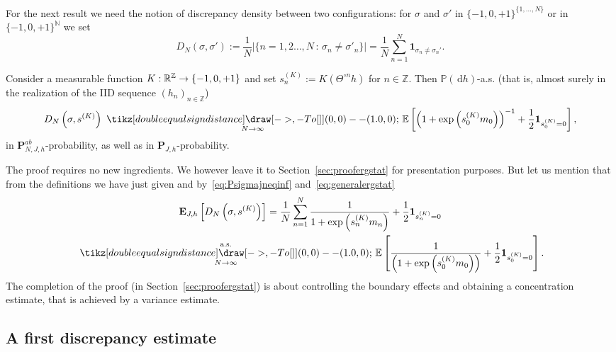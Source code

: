 \documentclass[10pt]{amsart}
\theoremstyle{definition}\newtheorem{defi}[theo]{Definition}\newtheorem{rema}[theo]{Remark}\newtheorem{exam}[theo]{Example}\newtheorem{exem}[theo]{Example}\newtheorem{nota}[theo]{Notation}
\newlength{\LETTERheight}
\newcommand*{\longto}[1]{\ %
{\tikz[double equal sign distance] \draw [->,-{To[]}] (0,0) -- (#1,0);}\ }
\newcommand{\ind}{\mathbf{1}}
\newcommand{\bP}{\mathbf{P}}
\newcommand{\bE}{\mathbf{E}}
\newcommand{\bbE}{\mathbb{E}}
\newcommand{\bbN}{\mathbb{N}}
\newcommand{\bbP}{\mathbb{P}}
\newcommand{\bbR}{\mathbb{R}}
\newcommand{\bbZ}{\mathbb{Z}}
\newcommand{\dd}{\,\mathrm{d}}
\newcommand{\gs}{\sigma}
\renewcommand*{\to}{\mathchoice{\longrightarrow}{\rightarrow}{\rightarrow}{\rightarrow}}
\begin{document}
For the next result we need the notion of discrepancy density between two configurations: for $\sigma$ and $\sigma'$ in $ \{-1, 0, +1\}^{\{1, \dots, N\}}$ or in $\{-1, 0, +1\}^{\bbN}$ we set
\begin{equation}\label{eq:D_N}
D_N(\sigma, \sigma'):= \frac1N \left | \bigl\{ n=1,2 \dots, N \,:\, \gs_n \neq \gs'_n\bigr\}\right| = \frac1N \sum_{n=1}^N \ind_{\gs_n\neq \gs_n'}.
\end{equation}

\begin{prop}\label{th:ergstatK}
Consider a measurable function $K: \bbR^\bbZ\to \{-1,0, +1\}$ and set $s^{(K)}_n:=K(\Theta^{\circ n} h)$ for $n\in\bbZ$. Then $\bbP(\dd h)$-a.s. (that is, almost surely in the realization of the IID sequence $(h_n)_{n\in\bbZ}$)
\begin{equation}\label{eq:ergstatK}
D_N\left(\sigma, s^{(K)}\right) \underset{N\to\infty}{{\longto{1.0}}} \bbE\left[\left(1+\exp\left(s^{(K)}_0 m_0\right)\right)^{-1}+\frac12\ind_{s^{(K)}_0 =0}\right],
\end{equation}
in $\bP^{ab}_{N, J, h}$-probability, as well as in $\bP_{J, h}$-probability.
\end{prop}


The proof requires no new ingredients. We however leave it to Section~\ref{sec:proofergstat} for presentation purposes. But let us mention that from the definitions we have just given and by~\eqref{eq:Psigmajneqinf} and~\eqref{eq:generalergstat}
\begin{multline}
\label{eq:ergstatconvinexpect}
\bE_{J, h}\left[D_N\left(\sigma, s^{(K)}\right) \right]= \frac 1 N\sum_{n=1}^N \frac1{1+\exp\left(s^{(K)}_n m_n\right)}+\frac12\ind_{s^{(K)}_n =0}
\\
\underset{N \to \infty}{\overset{\text{a.s.}}{\longto{1.0}}}
\bbE\left[\frac 1{\left(1+\exp\left(s^{(K)}_0 m_0\right)\right)}+\frac12\ind_{s^{(K)}_0 =0}\right].
\end{multline}
The completion of the proof (in Section~\ref{sec:proofergstat}) is about controlling the boundary effects and obtaining a concentration estimate, that is achieved by a variance estimate.



\subsection{A first discrepancy estimate}
\end{document}
